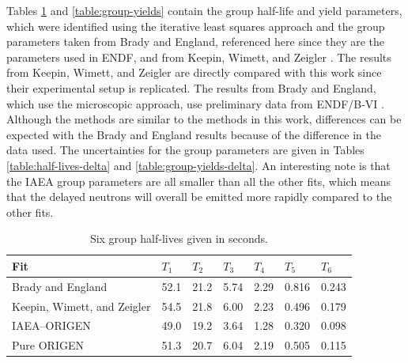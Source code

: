 \documentclass{style/nseJournal}
\begin{document}
Tables \ref{table:half-lives} and \ref{table:group-yields} contain the group half-life and yield parameters, which were identified using the iterative least squares approach and the group parameters taken from Brady and England, referenced here since they are the parameters used in ENDF, and from Keepin, Wimett, and Zeigler \cite{doi:10.13182/NSE103-129, KEEPIN1957IN2}.
The results from Keepin, Wimett, and Zeigler are directly compared with this work since their experimental setup is replicated.
The results from Brady and England, which use the microscopic approach, use preliminary data from ENDF/B-VI \cite{england1983status}.
Although the methods are similar to the methods in this work, differences can be expected with the Brady and England results because of the difference in the data used.
The uncertainties for the group parameters are given in Tables \ref{table:half-lives-delta} and \ref{table:group-yields-delta}.
An interesting note is that the IAEA group parameters are all smaller than all the other fits, which means that the delayed neutrons will overall be emitted more rapidly compared to the other fits.

\begin{table}[]
\caption{Six group half-lives given in seconds.}
\centering
\begin{tabular}{|l l l l l l l|} 
 \hline
 Fit & $T_1$ & $T_2$ & $T_3$ & $T_4$ & $T_5$ & $T_6$\\
 \hline\hline
    Brady and England \cite{doi:10.13182/NSE103-129} & 52.1 & 21.2 & 5.74 & 2.29 & 0.816 & 0.243\\
    Keepin, Wimett, and Zeigler \cite{KEEPIN1957IN2} & 54.5 & 21.8 & 6.00 & 2.23 & 0.496 & 0.179 \\
    IAEA--ORIGEN & 49.0 & 19.2 & 3.64 & 1.28 & 0.320 & 0.098 \\
    Pure ORIGEN & 51.3 & 20.7 & 6.04 & 2.19 & 0.505 & 0.115 \\
 \hline
\end{tabular}
\label{table:half-lives}
\end{table}
\end{document}
